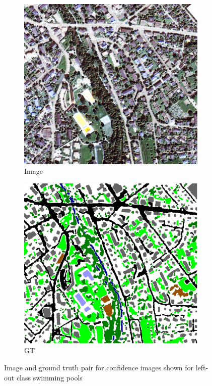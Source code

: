 \documentclass[10pt]{article}
\begin{document}
\begin{figure}[H]
	\centering
	\begin{subfigure}{.32\textwidth}
		\includegraphics[width=\textwidth]{Im_16}
		\caption{Image}
	\end{subfigure}
	\begin{subfigure}{.32\textwidth}
		\includegraphics[width=\textwidth]{GT_16}
		\caption{\acrlong{GT}}
	\end{subfigure}
	\caption{Image and ground truth pair for confidence images shown for left-out class swimming pools}
\end{figure}
\end{document}
